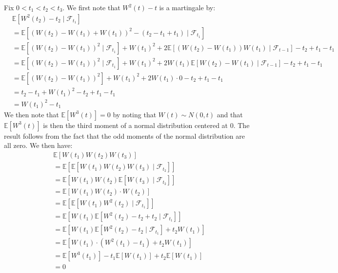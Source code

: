 \documentclass[12pt,twoside, letter]{exam}
\theoremstyle{definition}
\newcommand{\ee}{\mathbb{E}}
\begin{document}
\begin{solution}
  Fix $0 < t_1 < t_2 < t_3$. We first note that $W^2(t) - t$ is a martingale by:
  \begin{align*}
    &\ee[W^2(t_2) - t_2 \mid \mathcal{F}_{t_1}] \\
    &= \ee[(W(t_2) - W(t_1) + W(t_1))^2 - (t_2 - t_1 + t_1) \mid \mathcal{F}_{t_1}] \\
    &= \ee[(W(t_2)-W(t_1))^2\mid \mathcal{F}_{t_1}] + W(t_1)^2 + 2\ee[(W(t_2)-W(t_1))W(t_1) \mid \mathcal{F}_{t-1}] - t_2 + t_1 - t_1 \\
    &= \ee[(W(t_2)-W(t_1))^2\mid \mathcal{F}_{t_1}] + W(t_1)^2 + 2W(t_1)\ee[W(t_2)-W(t_1) \mid \mathcal{F}_{t-1}] - t_2 + t_1 - t_1 \\
    &= \ee[(W(t_2) - W(t_1))^2] + W(t_1)^2 + 2W(t_1) \cdot 0 - t_2 + t_1 - t_1 \\
    &= t_2 - t_1 + W(t_1)^2 - t_2 + t_1 - t_1 \\
    &= W(t_1)^2 - t_1
  \end{align*}
  We then note that $\ee[W^{3}(t)] = 0$ by noting that $W(t) \sim N(0, t)$ and that $\ee[W^{3}(t)]$ is then the third moment of
  a normal distribution centered at 0. The result follows from the fact that the odd moments of the normal distribution are all zero.
  We then have:
  \begin{align*}
    &\ee[W(t_1)W(t_2)W(t_3)] \\
    &= \ee[\ee[W(t_1)W(t_2)W(t_3) \mid \mathcal{F}_{t_2}]] \\
    &= \ee[W(t_1)W(t_2)\ee[W(t_3) \mid \mathcal{F}_{t_2}]] \\
    &= \ee[W(t_1)W(t_2)\cdot W(t_2)] \\
    &= \ee[\ee[W(t_1)W^2(t_2) \mid \mathcal{F}_{t_1}]]  \\
    &= \ee[W(t_1)\ee[W^2(t_2) - t_2 + t_2 \mid \mathcal{F}_{t_1}]]  \\
    &= \ee[W(t_1)\ee[W^2(t_2) - t_2 \mid \mathcal{F}_{t_1}] + t_2W(t_1)] \\
    &= \ee[W(t_1)\cdot (W^2(t_1) - t_1) + t_2W(t_1)] \\
    &= \ee[W^3(t_1)] - t_1\ee[W(t_1)] + t_2\ee[W(t_1)] \\
    &= 0
  \end{align*}
\end{solution}
\end{document}
